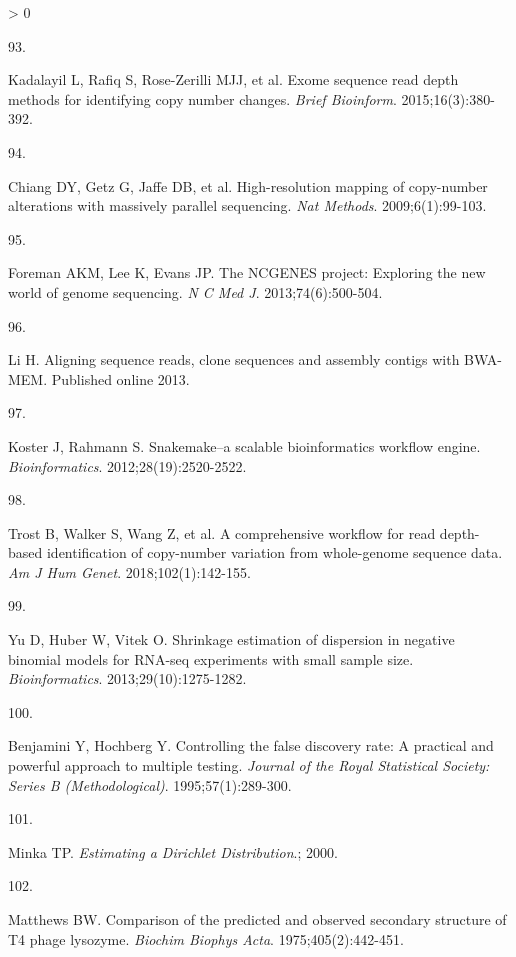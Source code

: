 \documentclass[11pt,letterpaper,oneside]{book}
\newlength{\cslhangindent}
\newlength{\csllabelwidth}
\newenvironment{CSLReferences}[3] %
 {%
  \setlength{\parindent}{0pt}
  \ifodd #1 \everypar{\setlength{\hangindent}{\cslhangindent}}\ignorespaces\fi
  \ifnum #2 > 0
  \setlength{\parskip}{#2\baselineskip}
  \fi
 }%
 {}
\newcommand{\CSLLeftMargin}[1]{\parbox[t]{\maxof{\widthof{#1}}{\csllabelwidth}}{#1}}
\newcommand{\CSLRightInline}[1]{\parbox[t]{\linewidth-\csllabelwidth}{#1}\newline}
\begin{document}
\begin{CSLReferences}{0}{0}
\leavevmode\hypertarget{ref-kadalayil:2015aa}{}%
\CSLLeftMargin{93. }
\CSLRightInline{Kadalayil L, Rafiq S, Rose-Zerilli MJJ, et al. Exome sequence read depth methods for identifying copy number changes. \emph{Brief Bioinform}. 2015;16(3):380-392.}

\leavevmode\hypertarget{ref-chiang:2009aa}{}%
\CSLLeftMargin{94. }
\CSLRightInline{Chiang DY, Getz G, Jaffe DB, et al. High-resolution mapping of copy-number alterations with massively parallel sequencing. \emph{Nat Methods}. 2009;6(1):99-103.}

\leavevmode\hypertarget{ref-foreman:2013aa}{}%
\CSLLeftMargin{95. }
\CSLRightInline{Foreman AKM, Lee K, Evans JP. The {NCGENES} project: Exploring the new world of genome sequencing. \emph{N C Med J}. 2013;74(6):500-504.}

\leavevmode\hypertarget{ref-li:2013ab}{}%
\CSLLeftMargin{96. }
\CSLRightInline{Li H. Aligning sequence reads, clone sequences and assembly contigs with BWA-MEM. Published online 2013.}

\leavevmode\hypertarget{ref-koster:2012aa}{}%
\CSLLeftMargin{97. }
\CSLRightInline{Koster J, Rahmann S. Snakemake--a scalable bioinformatics workflow engine. \emph{Bioinformatics}. 2012;28(19):2520-2522.}

\leavevmode\hypertarget{ref-trost:2018aa}{}%
\CSLLeftMargin{98. }
\CSLRightInline{Trost B, Walker S, Wang Z, et al. A comprehensive workflow for read depth-based identification of copy-number variation from whole-genome sequence data. \emph{Am J Hum Genet}. 2018;102(1):142-155.}

\leavevmode\hypertarget{ref-yu:2013aa}{}%
\CSLLeftMargin{99. }
\CSLRightInline{Yu D, Huber W, Vitek O. Shrinkage estimation of dispersion in negative binomial models for RNA-seq experiments with small sample size. \emph{Bioinformatics}. 2013;29(10):1275-1282.}

\leavevmode\hypertarget{ref-benjamini:1995aa}{}%
\CSLLeftMargin{100. }
\CSLRightInline{Benjamini Y, Hochberg Y. Controlling the false discovery rate: A practical and powerful approach to multiple testing. \emph{Journal of the Royal Statistical Society: Series B (Methodological)}. 1995;57(1):289-300.}

\leavevmode\hypertarget{ref-minka:2000aa}{}%
\CSLLeftMargin{101. }
\CSLRightInline{Minka TP. \emph{Estimating a Dirichlet Distribution}.; 2000.}

\leavevmode\hypertarget{ref-matthews:1975aa}{}%
\CSLLeftMargin{102. }
\CSLRightInline{Matthews BW. Comparison of the predicted and observed secondary structure of T4 phage lysozyme. \emph{Biochim Biophys Acta}. 1975;405(2):442-451.}


\end{CSLReferences}
\end{document}

